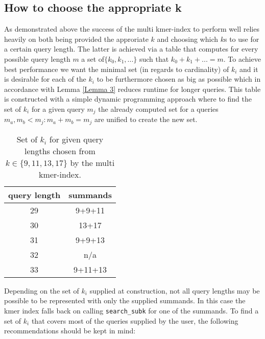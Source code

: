 \subsection{How to choose the appropriate k}
As demonstrated above the success of the multi kmer-index to perform well relies heavily on both being provided the
approriate $k$ and choosing which $k$s to use for a certain query length. The latter is achieved
via a table that computes for every possible query length $m$ a set of$\{k_{0},k_{1},...\}$
such that $k_{0}+k_{1}+...=m$. To achieve best performance we want
the minimal set (in regards to cardinality) of $k_{i}$ and it is desirable for each of the $k_{i}$ to be furthermore chosen
as big as possible which in accordance with Lemma \ref{Lemma 3} reduces runtime for longer queries. This table is constructed with a simple
dynamic programming approach where to find the set of $k_{i}$ for a given query $m_{j}$ the already computed
set for a queries $m_{a},m_{b}<m_{j}:m_{a}+m_{b}=m_{j}$ are unified to create the new set.

\begin{table}[H]
\centering{}\caption{Set of $k_{i}$ for given query lengths chosen from $k\in\{9,11,13,17\}$
by the multi kmer-index.}
\begin{tabular}{cc}
\toprule
query length & summands\tabularnewline
\midrule
\midrule
29 & 9+9+11\tabularnewline
\midrule
30 & 13+17\tabularnewline
\midrule
31 & 9+9+13\tabularnewline
\midrule
32 & n/a\tabularnewline
\midrule
33 & 9+11+13\tabularnewline
\bottomrule
\end{tabular}
\end{table}

Depending on the set of $k_{i}$ supplied at construction, not all query lengths may
be possible to be represented with only the supplied summands. In this
case the kmer index falls back on calling \lstinline{search_subk}
for one of the summands.\pagebreak\newline
To find a set of $k_{i}$ that covers most
of the queries supplied by the user, the following recommendations
should be kept in mind:

